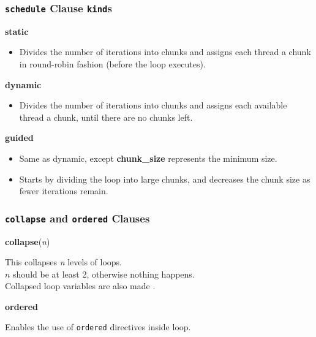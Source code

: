 \documentclass[aspectratio=43]{beamer}
\newenvironment{changemargin}[1]{%
  \begin{list}{}{%
    \setlength{\topsep}{0pt}%
    \setlength{\leftmargin}{#1}%
    \setlength{\rightmargin}{1em}
    \setlength{\listparindent}{\parindent}%
    \setlength{\itemindent}{\parindent}%
    \setlength{\parsep}{\parskip}%
  }%
  \item[]}{\end{list}}
\begin{document}
\begin{frame}
  \frametitle{{\tt schedule} Clause {\tt kind}s}

  \begin{changemargin}{2.5cm}
    {\bf static}
    \begin{itemize}
      \item Divides the number of iterations into chunks and assigns each thread
        a chunk in round-robin fashion (before the loop executes).
    \end{itemize}

    {\bf dynamic}
    \begin{itemize}
      \item Divides the number of iterations into chunks and assigns each
        available thread a chunk, until there are no chunks left.
    \end{itemize}

    {\bf guided}
    \begin{itemize}
      \item Same as dynamic, except {\bf chunk\_size} represents the minimum
        size.
      \item Starts by dividing the loop into large chunks, and decreases the
        chunk size as fewer iterations remain.
    \end{itemize}
  \end{changemargin}

\end{frame}

\begin{frame}
  \frametitle{{\tt collapse} and {\tt ordered} Clauses}

  \begin{changemargin}{1cm}
  \begin{center}
    {\bf collapse}({\it n})
  \end{center}

    This collapses {\it n} levels of loops.\\[1em]
    $n$ should be at least 2, otherwise nothing happens.\\[1em]
    Collapsed loop variables are also made .\\[2em]

  \begin{center}
    {\bf ordered}
  \end{center}
  
    Enables the use of {\tt ordered} directives inside loop.
  \end{changemargin}

\end{frame}
\end{document}
